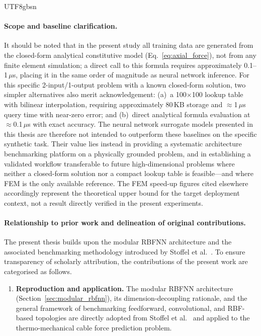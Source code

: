 \documentclass[a4paper,12pt]{report}
\begin{document}
\begin{CJK}{UTF8}{gbsn}
\paragraph{Scope and baseline clarification.}
It should be noted that in the present study all training data are generated from the
closed-form analytical constitutive model (Eq.~\eqref{eq:axial_force}), not from any
finite element simulation; a direct call to this formula requires approximately
0.1--1\,$\mu$s, placing it in the same order of magnitude as neural network inference.
For this specific 2-input/1-output problem with a known closed-form solution, two
simpler alternatives also merit acknowledgement: (a)~a 100$\times$100 lookup table with
bilinear interpolation, requiring approximately 80\,KB storage and $\approx$1\,$\mu$s
query time with near-zero error; and (b)~direct analytical formula evaluation at
$\approx$0.1\,$\mu$s with exact accuracy. The neural network surrogate models presented
in this thesis are therefore not intended to outperform these baselines on the specific
synthetic task. Their value lies instead in providing a systematic architecture
benchmarking platform on a physically grounded problem, and in establishing a validated
workflow transferable to future high-dimensional problems where neither a closed-form
solution nor a compact lookup table is feasible---and where FEM is the only available
reference. The FEM speed-up figures cited elsewhere accordingly represent the theoretical
upper bound for the target deployment context, not a result directly verified in the
present experiments.

\paragraph{Relationship to prior work and delineation of original contributions.}
The present thesis builds upon the modular RBFNN architecture and the associated
benchmarking methodology introduced by Stoffel et al.~\cite{stoffel2020}.
To ensure transparency of scholarly attribution, the contributions of the present work
are categorised as follows.

\begin{enumerate}[label=(\roman*)]
  \item \textbf{Reproduction and application.}
    The modular RBFNN architecture (Section~\ref{sec:modular_rbfnn}), its
    dimension-decoupling rationale, and the general framework of benchmarking
    feedforward, convolutional, and RBF-based topologies are directly adopted from
    Stoffel et al.~\cite{stoffel2020} and applied to the thermo-mechanical cable
    force prediction problem.


\end{enumerate}
\end{CJK}
\end{document}
